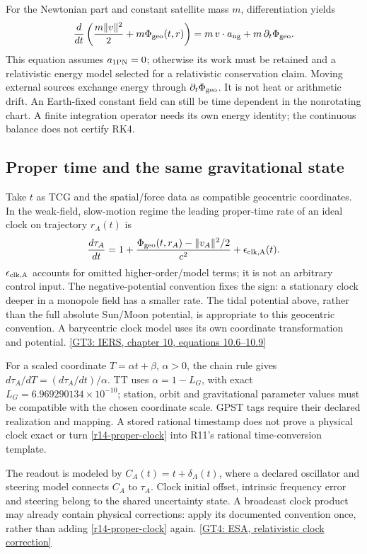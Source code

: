 For the Newtonian part and constant satellite mass $m$, differentiation yields
\begin{equation}
 \frac{d}{dt}\left(\frac{m\|v\|^2}{2}+m\Phi_{\rm geo}(t,r)\right)
 =m\,v\cdot a_{\rm ng}+m\,\partial_t\Phi_{\rm geo} .
 \label{r14-orbital-energy}
\end{equation}
This equation assumes $a_{\rm 1PN}=0$; otherwise its work must be retained and
a relativistic energy model selected for a relativistic conservation claim.
Moving external sources exchange energy through $\partial_t\Phi_{\rm geo}$.
It is not heat or arithmetic drift. An Earth-fixed constant field can still
be time dependent in the nonrotating chart. A finite integration operator
needs its own energy identity; the continuous balance does not certify RK4.

\subsection{Proper time and the same gravitational state}
Take $t$ as TCG and the spatial/force data as compatible geocentric coordinates.
In the weak-field, slow-motion regime the leading proper-time rate of an
ideal clock on trajectory $r_A(t)$ is
\begin{equation}
 \frac{d\tau_A}{dt}=1+
 \frac{\Phi_{\rm geo}(t,r_A)-\|v_A\|^2/2}{c^2}
 +\epsilon_{\rm clk,A}(t) .
 \label{r14-proper-clock}
\end{equation}
$\epsilon_{\rm clk,A}$ accounts for omitted higher-order/model terms; it is
not an arbitrary control input. The negative-potential convention fixes the
sign: a stationary clock deeper in a monopole field has a smaller rate.
The tidal potential above, rather than the full absolute Sun/Moon potential,
is appropriate to this geocentric convention. A barycentric clock model uses
its own coordinate transformation and potential.
\href{https://iers-conventions.obspm.fr/content/chapter10/tn36_c10.pdf}{[GT3: IERS, chapter 10, equations 10.6--10.9]}

For a scaled coordinate $T=\alpha t+\beta$, $\alpha>0$, the chain rule gives
$d\tau_A/dT=(d\tau_A/dt)/\alpha$. TT uses $\alpha=1-L_G$, with exact
$L_G=6.969290134\times10^{-10}$; station, orbit and
gravitational parameter values must be compatible with the chosen coordinate
scale. GPST tags require their declared realization and mapping. A stored
rational timestamp does not prove a physical clock exact or turn
\eqref{r14-proper-clock} into R11's rational time-conversion template.

The readout is modeled by $C_A(t)=t+\delta_A(t)$, where a declared oscillator
and steering model connects $C_A$ to $\tau_A$. Clock initial offset, intrinsic
frequency error and steering belong to the shared uncertainty state. A
broadcast clock product may already contain physical corrections: apply its
documented convention once, rather than adding \eqref{r14-proper-clock} again.
\href{https://gssc.esa.int/navipedia/index.php/Relativistic_Clock_Correction}{[GT4: ESA, relativistic clock correction]}

